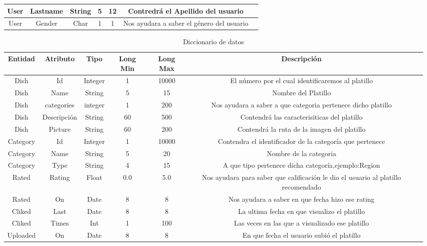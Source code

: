 \begin{landscape}
\begin{table}[h]
\begin{center}
\begin{tabular}{ | c | c | c | c | c | c |p{5cm}}
        \midrule
        User & Lastname  & String & 5 & 12 & Contredrá el Apellido del usuario \\
        \midrule
        User & Gender  & Char & 1 & 1  & Nos ayudara a saber el género del usuario \\
        \bottomrule
      \end{tabular}
    \end{center}
  \end{table}
 \newpage
  \begin{table}
    \begin{center}
      \begin{tabular}{ | c | c | c | c | c | c |p{5cm}}
        \toprule
        Entidad & Atributo & Tipo & Long Min & Long Max & Descripción\\
        \midrule
        Dish & Id & Integer & 1 & 10000  & El número por el cual identificaremos al platillo\\
        \midrule
        Dish & Name  & String& 5 & 15  & Nombre del Platillo \\
        \midrule
        Dish & categories & integer & 1 & 200  &  Nos ayudara a saber a que categoria pertenece dicho 			    platillo\\
        \midrule
        Dish & Descripción & String & 60 & 500  & Contendrá las caracterisiticas del platillo \\
        \midrule
        Dish & Picture  & String & 60 & 200 & Contendrá la ruta de la imagen del platillo \\
        \midrule
        Category & Id & Integer & 1 & 10000 & Contendra el identificador de la categoría que pertenece \\
        \midrule
       	Category & Name  & String & 5 & 20  & Nombre de la categoria \\
        \midrule
        Category & Type  & String & 4 & 15  & A que tipo pertenece dicha categoría,ejemplo:Region \\
        \midrule
        Rated & Rating  & Float & 0.0 & 5.0  & Nos ayudara para saber que calificación le dio el usuario 			al platillo recomendado  \\
        \midrule
        Rated & On  & Date & 8 & 8  & Nos ayudara a saber en que fecha hizo ese rating \\
        \midrule
        Cliked & Last  & Date & 8 & 8  & La ultima fecha en que visualizo el platillo \\
        \midrule
        Cliked & Times  & Int & 1 &   100  & Las veces en las que a visualizado ese platillo \\
        \midrule
        Uploaded & On  & Date & 8 & 8 & En que fecha el usuario subió el platillo \\
        \bottomrule
      \end{tabular}
      \caption{Diccionario de datos}
      \label{Diccionario de datos}
    \end{center}
  \end{table}
\end{landscape}  
  